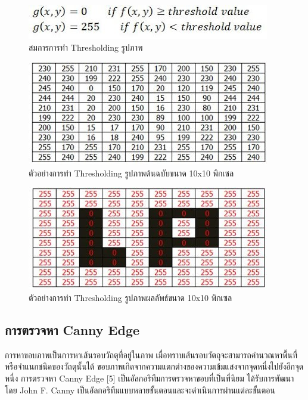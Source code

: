 		\begin{figure}[H]	
			\centering			
			\includegraphics[scale=1]{Figures/2/thresholding}
			\caption{สมการการทำ Thresholding รูปภาพ}
			\label{Fig:thresholding}
		\end{figure}
		
		\begin{figure}[H]	
			\centering			
			\includegraphics[scale=1]{Figures/2/thresholding-example}
			\caption{ตัวอย่างการทำ Thresholding รูปภาพต้นฉบับขนาด 10x10 พิกเซล}
			\label{Fig:thresholding-example}
		\end{figure}

		\begin{figure}[H]
			\centering					
			\includegraphics[scale=1]{Figures/2/thresholding-result}
			\caption{ตัวอย่างการทำ Thresholding รูปภาพผลลัพธ์ขนาด 10x10 พิกเซล}
			\label{Fig:thresholding-result}
		\end{figure}

	\subsection{การตรวจหา Canny Edge}
		การหาขอบภาพเป็นการหาเส้นรอบวัถตุที่อยู่ในภาพ เมื่อทราบเส้นรอบวัตถุจะสามารถคำนวณหาพื้นที่หรือจำแนกชนิดของวัถตุนั้นได้ ขอบภาพเกิดจากความแตกต่างของความเข้มแสงจากจุดหนึ่งไปยังอีกจุดหนึ่ง การตรวจหา Canny Edge [5] เป็นอัลกอริทึมการตรวจหาขอบที่เป็นที่นิยม ได้รับการพัฒนาโดย John F. Canny เป็นอัลกอริทึมแบบหลายขั้นตอนและจะดำเนินการผ่านแต่ละขั้นตอน
